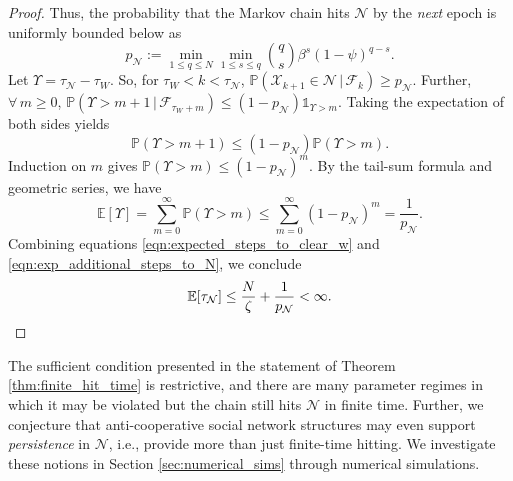 \documentclass[conference]{IEEEtran}
\begin{document}
\begin{proof}
    Thus, the probability that the Markov chain hits $\mathcal{N}$ by the \emph{next} epoch is uniformly bounded below as
    \begin{equation}
        p_{\mathcal{N}} := \min_{1 \leq q \leq N}\min_{1 \leq s \leq q}{q \choose s}\beta^{s}(1 - \psi)^{q - s}.
    \end{equation}
    Let $\Upsilon = \tau_{\mathcal{N}} - \tau_W$. So, for $\tau_W < k < \tau_{\mathcal{N}}$, $\mathbb{P}(\mathcal{X}_{k+1} \in \mathcal{N} \, | \, \mathcal{F}_k)  \ge p_{\mathcal{N}}$.
    Further, $\forall \, m \ge 0$, $\mathbb{P}(\Upsilon > m +1 \, | \, \mathcal{F}_{\tau_W + m}) \leq (1 - p_{\mathcal{N}})\mathds{1}_{\Upsilon > m}$. Taking the expectation of both sides yields 
    \begin{equation}\label{eqn:prob_bound_hit_n}
        \mathbb{P}(\Upsilon > m + 1) \leq (1- p_{\mathcal{N}})\mathbb{P}(\Upsilon > m).
    \end{equation}
    Induction on $m$ gives $\mathbb{P}(\Upsilon > m) \leq (1-p_{\mathcal{N}})^m$.
    By the tail-sum formula and geometric series, we have
    \begin{equation}\label{eqn:exp_additional_steps_to_N}
        \mathbb{E}[\Upsilon] = \sum^{\infty}_{m = 0} \mathbb{P}(\Upsilon > m) \leq \sum^{\infty}_{m = 0} (1 - p_{\mathcal{N}})^m = \frac{1}{p_{\mathcal{N}}}.
    \end{equation}
    Combining equations \eqref{eqn:expected_steps_to_clear_w} and \eqref{eqn:exp_additional_steps_to_N}, we conclude
    \begin{equation}
        \mathbb{E}[\tau_{\mathcal{N}}] \leq \frac{N}{\zeta} + \frac{1}{p_{\mathcal{N}}} < \infty. \qedhere
    \end{equation}
\end{proof}
The sufficient condition presented in the statement of Theorem \ref{thm:finite_hit_time} is restrictive, and there are many parameter regimes in which it may be violated but the chain still hits $\mathcal{N}$ in finite time. Further, we conjecture that anti-cooperative social network structures may even support \emph{persistence} in $\mathcal{N}$, i.e., provide more than  just finite-time hitting.
We investigate these notions in Section \ref{sec:numerical_sims} through numerical simulations.
\end{document}
